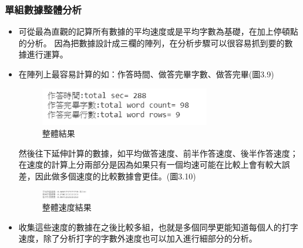 \subsubsection{單組數據整體分析}
\begin{itemize}
	\item 可從最為直觀的記算所有數據的平均速度或是平均字數為基礎，在加上停頓點的分析。
	因為把數據設計成三欄的陣列，在分析步驟可以很容易抓到要的數據進行運算。
	\item 在陣列上最容易計算的如：作答時間、做答完畢字數、做答完畢(圖3.9)
	\begin{figure}[H] 
		\centering 
		\includegraphics[width=0.7\textwidth]{3_8.png} 
		\caption{整體結果} 
		\label{Fig.3.9} 
	\end{figure}
	然後往下延伸計算的數據，如平均做答速度、前半作答速度、後半作答速度；在速度的計算上分兩部分是因為如果只有一個均速可能在比較上會有較大誤差，因此做多個速度的比較數據會更佳。(圖3.10)
	\begin{figure}[H] 
		\centering 
		\includegraphics[width=0.2\textwidth]{3_9.png} 
		\caption{整體速度結果} 
		\label{Fig.3.10} 
	\end{figure}
	\item 收集這些速度的數據在之後比較多組，也就是多個同學更能知道每個人的打字速度，除了分析打字的字數外速度也可以加入進行細部分的分析。
\end{itemize}

